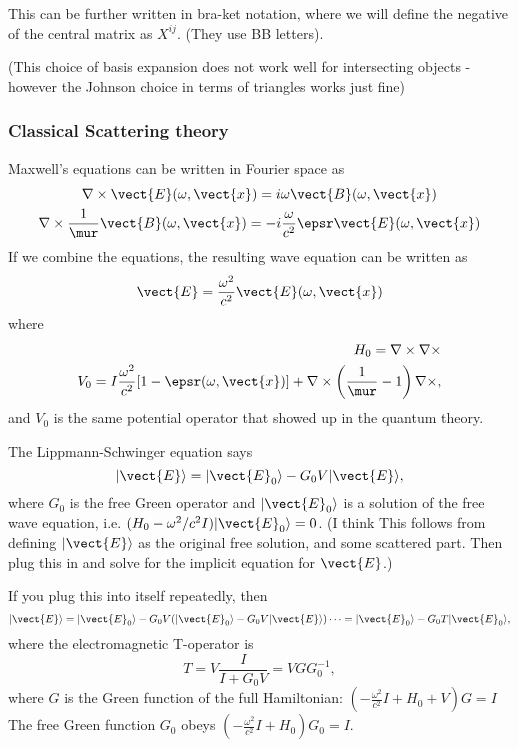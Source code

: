 This can be further written in bra-ket notation, where we will define the negative
of the central matrix as $X^{ij}$. (They use BB letters).

(This choice of basis expansion does not work well for intersecting objects - however the 
Johnson choice in terms of triangles works just fine)

\subsubsection{Classical Scattering  theory}

Maxwell's equations can be written in Fourier space as 
\begin{gather}
\nabla\times\vect{E}(\omega,\vect{x}) = i\omega \vect{B}(\omega,\vect{x})\\
\nabla\times\frac{1}{\mur}\vect{B}(\omega,\vect{x}) = -i\frac{\omega}{c^2}\epsr\vect{E}(\omega,\vect{x})
\end{gather}
If we combine the equations, the resulting wave equation can be written as
\begin{equation}
  [H_0+V(\omega,\vect{x})]\vect{E} = \frac{\omega^2}{c^2}\vect{E}(\omega,\vect{x})
\end{equation}
where 
\begin{align}
H_0 = \nabla\times\nabla\times \\
V_0 = I\frac{\omega^2}{c^2}[1-\epsr(\omega,\vect{x})]+\nabla\times\left(\frac{1}{\mur}-1\right)\nabla\times,
\end{align}
and $V_0$ is the same potential operator that showed up in the quantum theory.  

The Lippmann-Schwinger equation says
\begin{equation}
|\vect{E}\rangle = |\vect{E}_0\rangle - G_0V|\vect{E}\rangle,
\end{equation}
where $G_0$ is the free Green operator and $|\vect{E}_0\rangle$ is a solution of the free 
wave equation, i.e. $(H_0-\omega^2/c^2I)|\vect{E}_0\rangle=0$.  (I think This follows from
 defining $|\vect{E}\rangle$ as the original free solution, and some scattered part. Then plug this in
and solve for the implicit equation for $\vect{E}$.)

If you plug this into itself repeatedly, then 
\begin{equation}
|\vect{E}\rangle = |\vect{E}_0\rangle - G_0V(|\vect{E}_0\rangle - G_0V|\vect{E}\rangle)\cdots
=|\vect{E}_0\rangle -G_0T|\vect{E}_0\rangle,
\end{equation}
where the electromagnetic T-operator is
\begin{equation}
  T = V\frac{I}{I+G_0V}= VGG_0^{-1},
\end{equation}
where $G$ is the Green function of the full Hamiltonian: $(-\frac{\omega^2}{c^2}I+H_0+V)G=I$
The free Green function $G_0$ obeys $(-\frac{\omega^2}{c^2}I+H_0)G_0=I$.
  
